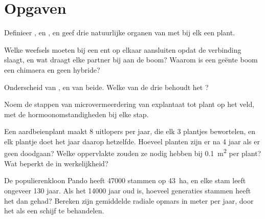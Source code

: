 \section{Opgaven}

\begin{exercise}[$\star$]\label{exo:b2:asexual-reproduction:1}
Definieer ,  en , en geef drie natuurlijke organen van
 met bij elk een plant.
\end{exercise}

\begin{exercise}[$\star$]\label{exo:b2:asexual-reproduction:2}
Welke weefsels moeten bij een ent op elkaar aansluiten opdat de verbinding
slaagt, en wat draagt elke partner bij aan de boom? Waarom is een geënte
boom een chimaera en geen hybride?
\end{exercise}

\begin{exercise}[$\star$]\label{exo:b2:asexual-reproduction:3}
Onderscheid  van , en  van
beide. Welke van de drie behoudt het ?
\end{exercise}

\begin{exercise}[$\star$]\label{exo:b2:asexual-reproduction:4}
Noem de stappen van microvermeerdering van explantaat tot plant op het
veld, met de hormoonomstandigheden bij elke stap.
\end{exercise}

\begin{exercise}[$\star\star$]\label{exo:b2:asexual-reproduction:5}
Een aardbeienplant maakt 8 uitlopers per jaar, die elk 3 plantjes
bewortelen, en elk plantje doet het jaar daarop hetzelfde. Hoeveel planten
zijn er na 4 jaar als er geen doodgaan? Welke oppervlakte zouden ze nodig
hebben bij \qty{0.1}{m^2} per plant? Wat beperkt de  in werkelijkheid?
\end{exercise}

\begin{exercise}[$\star\star$]\label{exo:b2:asexual-reproduction:6}
De populierenkloon Pando heeft \num{47000} stammen op \qty{43}{ha}, en elke
stam leeft ongeveer \num{130} jaar. Als het  \num{14000} jaar oud is,
hoeveel generaties stammen heeft het dan gehad? Bereken zijn gemiddelde
radiale opmars in meter per jaar, door het als een schijf te behandelen.
\end{exercise}

